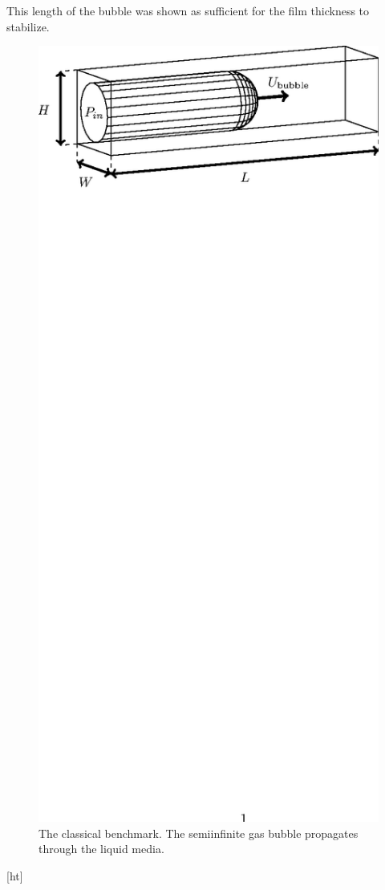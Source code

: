 \documentclass{article}
\begin{document}
This length of the bubble was shown as
sufficient for the film thickness to stabilize.   

\begin{figure}[ht]
\includegraphics*[bb=153 610 405 717,width=\textwidth]{Figures/benchmark_classical.eps} 
\caption{The classical benchmark. The semiinfinite gas bubble
propagates through the liquid media. \label{fig:classical:benchmark}}
\end{figure}[ht]
\end{document}
